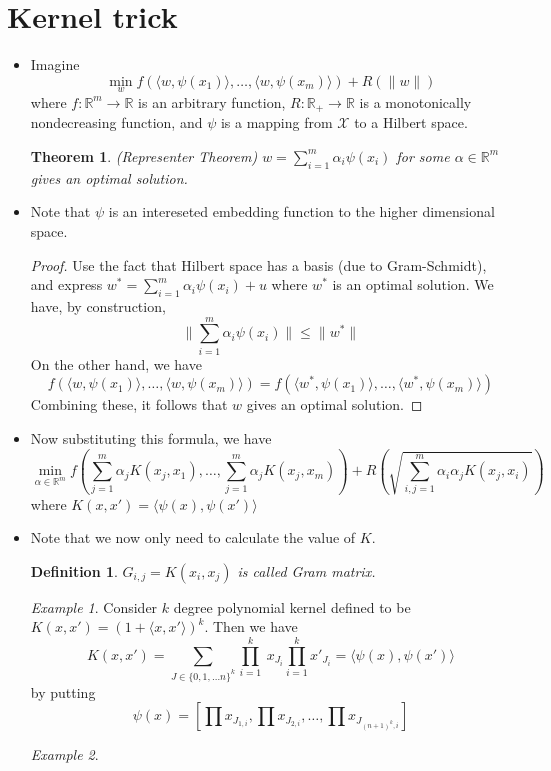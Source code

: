 \documentclass[11pt,reqno]{amsart}
\newtheorem{theorem}{Theorem}
\newtheorem{definition}{Definition}
\theoremstyle{remark}
\newtheorem{example}{Example}
\begin{document}
\begin{sloppypar}
\section{Kernel trick}
\begin{itemize}
\item Imagine
\[
\min\limits_w f(\langle w,\psi(x_1)\rangle,\dots,\langle w,\psi(x_m)\rangle)+R(\lVert w\rVert)
\]
where $f:\mathbb{R}^m\to \mathbb{R}$ is an arbitrary function, $R:\mathbb{R}_+\to\mathbb{R}$ is a monotonically nondecreasing function, and 
$\psi$ is a mapping from $\mathcal{X}$ to a Hilbert space.
\begin{theorem}(Representer Theorem)
$w=\sum^m_{i=1}\alpha_i\psi(x_i)$ for some $\alpha\in\mathbb{R}^m$ gives an optimal solution.
\end{theorem}
\item Note that $\psi$ is an intereseted embedding function to the higher dimensional space.
\begin{proof} 
Use the fact that Hilbert space has a basis (due to Gram-Schmidt), and express $w^*=\sum\limits^m_{i=1}\alpha_i\psi(x_i)+u$ where $w^*$ is an optimal solution. 
We have, by construction, 
\[
\lVert\sum\limits^m_{i=1}\alpha_i\psi(x_i)\rVert\leq \lVert w^*\rVert
\]
On the other hand, we have 
\[
f(\langle w,\psi(x_1)\rangle,\dots,\langle w,\psi(x_m)\rangle)=f(\langle w^*,\psi(x_1)\rangle,\dots,\langle w^*,\psi(x_m)\rangle)
\]
Combining these, it follows that $w$ gives an optimal solution.
\end{proof}
\item Now substituting this formula, we have 
\[
\min\limits_{\alpha\in\mathbb{R}^m}f(\sum\limits^m_{j=1}\alpha_jK(x_j,x_1),\dots,\sum\limits^m_
{j=1}\alpha_jK(x_j,x_m))+R(\sqrt{\sum\limits^m_{i,j=1}\alpha_i\alpha_jK(x_j,x_i)})
\]
where $K(x,x')=\langle \psi(x),\psi(x')\rangle$
\item Note that we now only need to calculate the value of $K$.
\begin{definition}
$G_{i,j}=K(x_i,x_j)$ is called Gram matrix.
\end{definition}
\begin{example}
Consider $k$ degree polynomial kernel defined to be $K(x,x')=(1+\langle x,x'\rangle)^k$. Then we have
\[
K(x,x')=\sum\limits_{J\in\{0,1,\dots n\}^k} \prod\limits^k_{i=1}\ x_{J_i}\prod\limits^k_{i=1}x'_{J_i}
=\langle \psi(x),\psi(x')\rangle
\]
by putting 
\[
\psi(x)=[\prod x_{J_{1,i}},\prod x_{J_{2,i}},\dots, \prod x_{J_{(n+1)^k,i}}]
\]
\end{example}
\begin{example}

\end{example}
\end{itemize}
\end{sloppypar}
\end{document}
